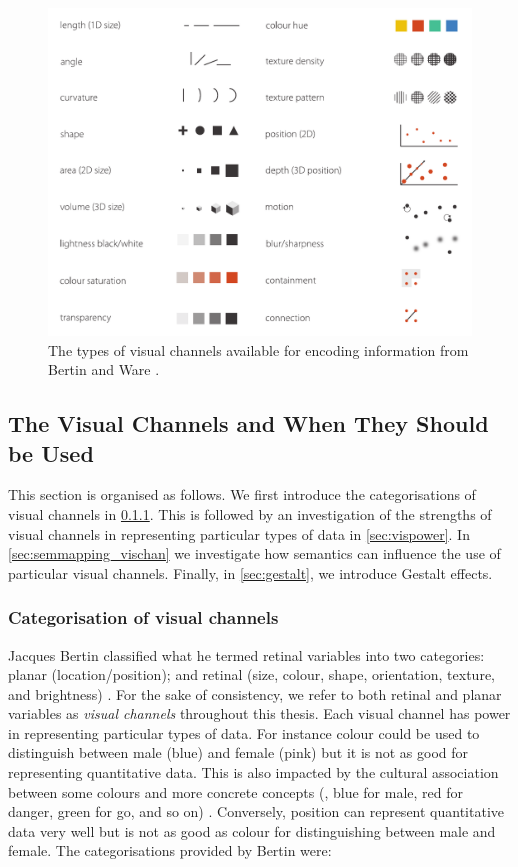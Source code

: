 \begin{figure}[t!]
\centering
\includegraphics[width=\textwidth]{images/related-work/visual-channels.pdf}
\caption{The types of visual channels available for encoding information from Bertin \cite{Bertin:1983:book} and Ware \cite{ware13}.}
\label{fig:visual-channels}
\end{figure}


\subsection{The Visual Channels and When They Should be Used}
\label{sec:retinal_variables}

This section is organised as follows.
We first introduce the categorisations of visual channels in \ref{sec:viscat}.
This is followed by an investigation of the strengths of visual channels in representing particular types of data in \ref{sec:vispower}.
In \ref{sec:semmapping_vischan} we investigate how semantics can influence the use of particular visual channels.
Finally, in \ref{sec:gestalt}, we introduce Gestalt effects.

\subsubsection{Categorisation of visual channels}
\label{sec:viscat}
Jacques Bertin classified what he termed retinal variables into two categories:
planar (location/position); and 
retinal (size, colour, shape, orientation, texture, and brightness) \cite{Bertin:1983:book,green98}. 
For the sake of consistency, we refer to both retinal and planar variables as \emph{visual channels} throughout this thesis.
Each visual channel has power in representing particular types of data. 
For instance colour could be used to distinguish between male (blue) and female (pink) but it is not as good for representing quantitative data. 
This is also impacted by the cultural association between some colours and more concrete concepts (\eg, blue for male, red for danger, green for go, and so on) \cite{lin2013selecting}. 
Conversely, position can represent quantitative data very well but is not as good as colour for distinguishing between male and female.
The categorisations provided by Bertin were:

